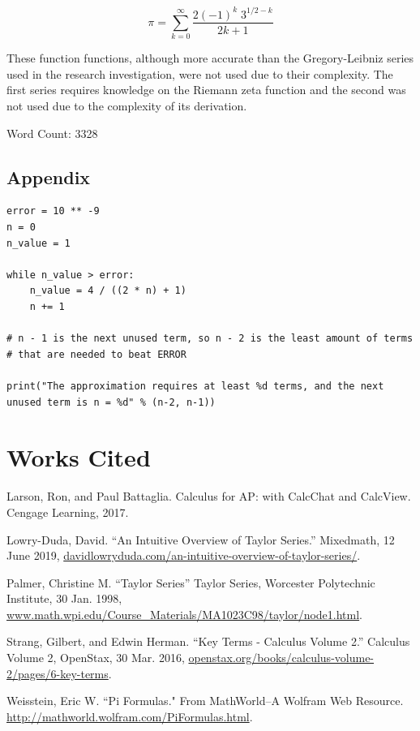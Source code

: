 \documentclass[12pt, titlepage]{article}
\begin{document}
\begin{equation}
    \pi = \sum_{k=0}^{\infty} \frac{2(-1)^{k} \; 3^{1/2-k}}{{2k+1}}
\end{equation}

These function functions, although more accurate than the Gregory-Leibniz series used in the research investigation, were not used due to their complexity. The first series requires knowledge on the Riemann zeta function and the second was not used due to the complexity of its derivation.

Word Count: 3328

\pagebreak
\begin{appendix}
\section{Appendix}
\begin{verbatim}
error = 10 ** -9
n = 0
n_value = 1

while n_value > error:
    n_value = 4 / ((2 * n) + 1)
    n += 1

# n - 1 is the next unused term, so n - 2 is the least amount of terms 
# that are needed to beat ERROR

print("The approximation requires at least %d terms, and the next
unused term is n = %d" % (n-2, n-1))
\end{verbatim}
\end{appendix}

\pagebreak
\section{Works Cited}

Larson, Ron, and Paul Battaglia. Calculus for AP: with CalcChat and CalcView. Cengage Learning, 2017.

Lowry-Duda, David. ``An Intuitive Overview of Taylor Series.” Mixedmath, 12 June 2019, \url{davidlowryduda.com/an-intuitive-overview-of-taylor-series/}.

Palmer, Christine M. ``Taylor Series” Taylor Series, Worcester Polytechnic Institute, 30 Jan. 1998, \url{www.math.wpi.edu/Course_Materials/MA1023C98/taylor/node1.html}.

Strang, Gilbert, and Edwin Herman. ``Key Terms - Calculus Volume 2.” Calculus Volume 2, OpenStax, 30 Mar. 2016, \url{openstax.org/books/calculus-volume-2/pages/6-key-terms}.

Weisstein, Eric W. ``Pi Formulas." From MathWorld--A Wolfram Web Resource. \url{http://mathworld.wolfram.com/PiFormulas.html}.
\end{document}
